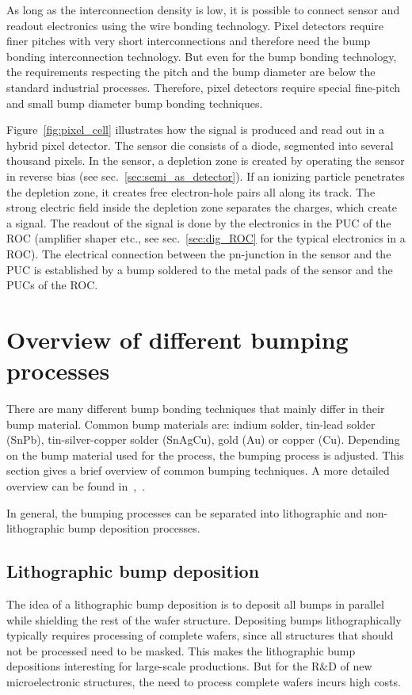 As long as the interconnection density is low, it is possible to connect sensor and readout electronics using the wire bonding technology. Pixel detectors require finer pitches with very short interconnections and therefore need the bump bonding interconnection technology. But even for the bump bonding technology, the requirements respecting the pitch and the bump diameter are below the standard industrial processes. Therefore, pixel detectors require special fine-pitch and small bump diameter bump bonding techniques.

Figure~\ref{fig:pixel_cell} illustrates how the signal is produced and read out in a hybrid pixel detector. The sensor die consists of a diode, segmented into several thousand pixels. In the sensor, a depletion zone is created by operating the sensor in reverse bias (see sec.~\ref{sec:semi_as_detector}). If an ionizing particle penetrates the depletion zone, it creates free electron-hole pairs all along its track. The strong electric field inside the depletion zone separates the charges, which create a signal. The readout of the signal is done by the electronics in the \ac{PUC} of the \ac{ROC} (amplifier shaper etc., see sec.~\ref{sec:dig_ROC} for the typical electronics in a \ac{ROC}). The electrical connection between the pn-junction in the sensor and the \ac{PUC} is established by a bump soldered to the metal pads of the sensor and the \ac{PUC}s of the \ac{ROC}.

\section{Overview of different bumping processes}\label{sec:bumping}
There are many different bump bonding techniques that mainly differ in their bump material. Common bump materials are: indium solder, tin-lead solder (SnPb), tin-silver-copper solder (SnAgCu), gold (Au) or copper (Cu). Depending on the bump material used for the process, the bumping process is adjusted. This section gives a brief overview of common bumping techniques. A more detailed overview can be found in~\cite{Hei12},~\cite{Big07}.

In general, the bumping processes can be separated into lithographic and non-lithographic bump deposition processes. 

\subsection{Lithographic bump deposition}
The idea of a lithographic bump deposition is to deposit all bumps in parallel while shielding the rest of the wafer structure. Depositing bumps lithographically typically requires processing of complete wafers, since all structures that should not be processed need to be masked. This makes the lithographic bump depositions interesting for large-scale productions. But for the R$\&$D of new microelectronic structures, the need to process complete wafers incurs high costs.

